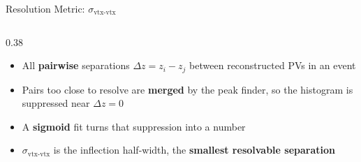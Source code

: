 \documentclass[xcolor=table,aspectratio=169]{beamer}
\begin{document}
\begin{frame}{Resolution Metric: \(\sigma_{\text{vtx-vtx}}\)}
    \begin{columns}[c]
        \begin{column}{0.38\linewidth}
            \footnotesize
            \begin{itemize}
                \setlength\itemsep{0.45em}
                \item All \textbf{pairwise} separations $\Delta z = z_i - z_j$ between
                    reconstructed PVs in an event
                \item Pairs too close to resolve are \textbf{merged} by the peak finder,
                    so the histogram is suppressed near $\Delta z = 0$
                \item A \textbf{sigmoid} fit turns that suppression into a number
                \item $\sigma_{\text{vtx-vtx}}$ is the inflection half-width, the
                    \textbf{smallest resolvable separation}
            \end{itemize}
            \vspace{0.6em}


\end{column}
\end{columns}
\end{frame}
\end{document}
